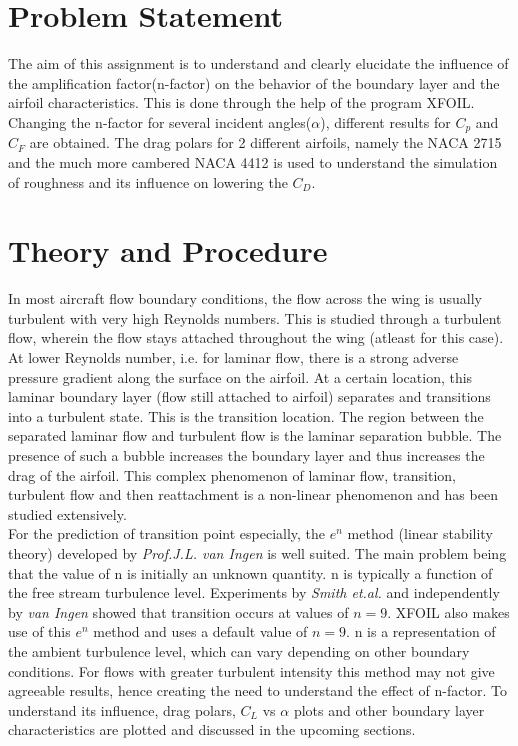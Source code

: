 \documentclass[main.tex]{subfiles}
\begin{document}
\section{Problem Statement}
The aim of this assignment is to understand and clearly elucidate the influence of the amplification factor(n-factor) on the behavior of the boundary layer and the airfoil characteristics. This is done through the help of the program XFOIL. Changing the n-factor for several incident angles($\alpha$), different results for $C_p$ and $C_F$ are obtained. The drag polars for 2 different airfoils, namely the NACA 2715 and the much more cambered NACA 4412 is used to understand the simulation of roughness and its influence on lowering the $C_D$.
\section{Theory and Procedure}
In most aircraft flow boundary conditions, the flow across the wing is usually turbulent with very high Reynolds numbers. This is studied through a turbulent flow, wherein the flow stays attached throughout the wing (atleast for this case). At lower Reynolds number, i.e. for laminar flow, there is a strong adverse pressure gradient along the surface on the airfoil. At a certain location, this laminar boundary layer (flow still attached to airfoil) separates and transitions into a turbulent state. This is the transition location. The region between the separated laminar flow and turbulent flow is the laminar separation bubble. The presence of such a bubble increases the boundary layer and thus increases the drag of the airfoil. This complex phenomenon of laminar flow, transition, turbulent flow and then reattachment is a non-linear phenomenon and has been studied extensively.\\
\indent For the prediction of transition point especially, the $e^n$ method (linear stability theory) developed by \textit{Prof.J.L. van Ingen\cite{van1956suggested}} is well suited. The main problem being that the value of n is initially an unknown quantity. n is typically a function of the free stream turbulence level. Experiments by \textit{Smith et.al.\cite{smith1956transition}} and independently by \textit{van Ingen} showed that transition occurs at values of $n=9$. XFOIL also makes use of this $e^n$ method and uses a default value of $n = 9$. n is a representation of the ambient turbulence level, which can vary depending on other boundary conditions. For flows with greater turbulent intensity this method may not give agreeable results, hence creating the need to understand the effect of n-factor. To understand its influence, drag polars, $C_L$ vs $\alpha$ plots and other boundary layer characteristics are plotted and discussed in the upcoming sections.
\end{document}
